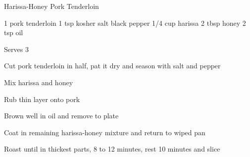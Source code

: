 \begin{recipe}{Harissa-Honey Pork Tenderloin}{}
\begin{ingredients}
1 pork tenderloin
1 tsp kosher salt
black pepper
1/4 cup harissa
2 tbsp honey
2 tsp oil
\end{ingredients}
\nextcolumn
Serves 3
\begin{steps}
    \item Cut pork tenderloin in half, pat it dry and season with salt and pepper
    \item Mix harissa and honey
    \item Rub thin layer onto pork
    \item Brown well in oil and remove to plate
    \item Coat in remaining harissa-honey mixture and return to wiped pan
    \item Roast until  in thickest parts, 8 to 12 minutes, rest 10 minutes and slice
\end{steps}
\end{recipe}